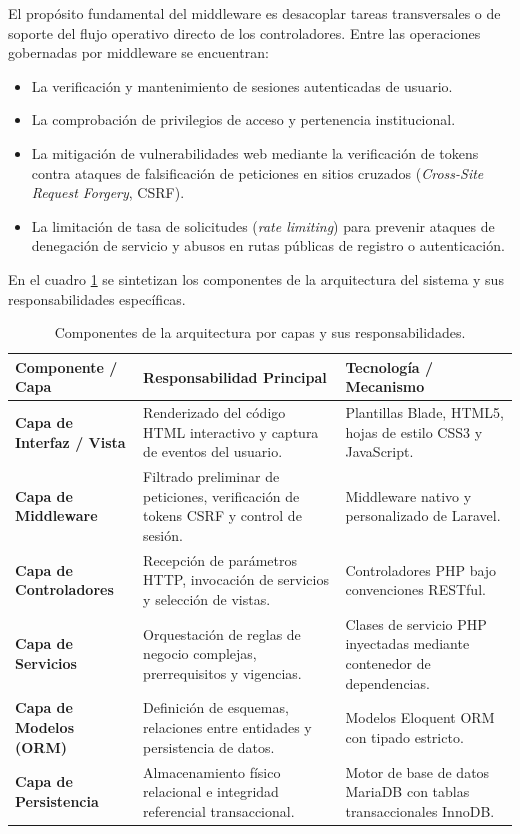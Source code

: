 El propósito fundamental del middleware es desacoplar tareas transversales o de soporte del flujo operativo directo de los controladores. Entre las operaciones gobernadas por middleware se encuentran:

\begin{itemize}
    \item La verificación y mantenimiento de sesiones autenticadas de usuario.
    \item La comprobación de privilegios de acceso y pertenencia institucional.
    \item La mitigación de vulnerabilidades web mediante la verificación de tokens contra ataques de falsificación de peticiones en sitios cruzados (\textit{Cross-Site Request Forgery}, CSRF).
    \item La limitación de tasa de solicitudes (\textit{rate limiting}) para prevenir ataques de denegación de servicio y abusos en rutas públicas de registro o autenticación.
\end{itemize}

En el cuadro \ref{tabla:arquitectura_capas} se sintetizan los componentes de la arquitectura del sistema y sus responsabilidades específicas.

\begin{table}[htbp]
\centering
\caption{Componentes de la arquitectura por capas y sus responsabilidades.}
\label{tabla:arquitectura_capas}
\small
\begin{tabularx}{\textwidth}{|p{3.5cm}|X|X|}
\hline
\rowcolor[gray]{0.9}
\textbf{Componente / Capa} & \textbf{Responsabilidad Principal} & \textbf{Tecnología / Mecanismo} \\
\hline
\textbf{Capa de Interfaz / Vista} & Renderizado del código HTML interactivo y captura de eventos del usuario. & Plantillas Blade, HTML5, hojas de estilo CSS3 y JavaScript. \\
\hline
\textbf{Capa de Middleware} & Filtrado preliminar de peticiones, verificación de tokens CSRF y control de sesión. & Middleware nativo y personalizado de Laravel. \\
\hline
\textbf{Capa de Controladores} & Recepción de parámetros HTTP, invocación de servicios y selección de vistas. & Controladores PHP bajo convenciones RESTful. \\
\hline
\textbf{Capa de Servicios} & Orquestación de reglas de negocio complejas, prerrequisitos y vigencias. & Clases de servicio PHP inyectadas mediante contenedor de dependencias. \\
\hline
\textbf{Capa de Modelos (ORM)} & Definición de esquemas, relaciones entre entidades y persistencia de datos. & Modelos Eloquent ORM con tipado estricto. \\
\hline
\textbf{Capa de Persistencia} & Almacenamiento físico relacional e integridad referencial transaccional. & Motor de base de datos MariaDB con tablas transaccionales InnoDB. \\
\hline
\end{tabularx}
\end{table}

